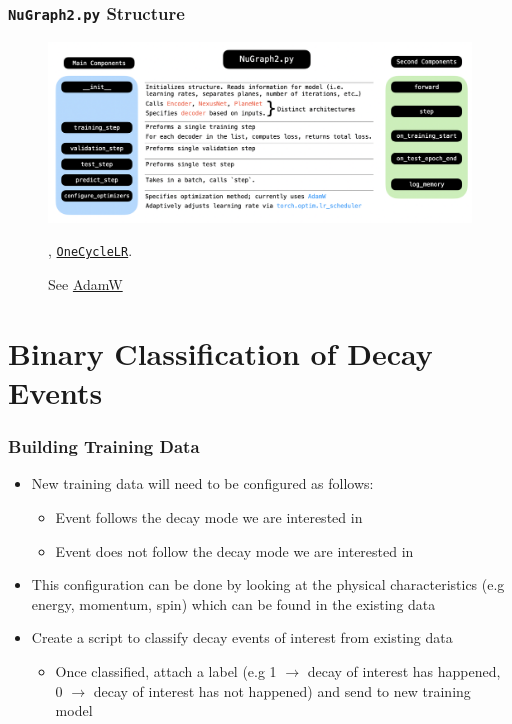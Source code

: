 \documentclass{beamer}
\begin{document}
\begin{frame}
	\frametitle{\texttt{NuGraph2.py} Structure}
		\begin{figure}[h!]
			\includegraphics[width=1\textwidth]{images/model2.png}
			\caption{See \href{https://pytorch.org/docs/stable/generated/torch.optim.AdamW.html}{\color{blue} AdamW}}, \href{https://pytorch.org/docs/stable/generated/torch.optim.lr_scheduler.OneCycleLR.html}{\color{blue} \texttt{OneCycleLR}}.
			\label{model2}
		\end{figure}
\end{frame}


\section{Binary Classification of Decay Events}


\begin{frame}
\frametitle{Building Training Data}
	\begin{itemize}
		\item New training data will need to be configured as follows:
			\begin{itemize}
				\item Event follows the decay mode we are interested in
				\item Event does not follow the decay mode we are interested in
			\end{itemize}
		\item This configuration can be done by looking at the physical characteristics (e.g energy, momentum, spin) which can be found in the existing data
		\item Create a script to classify decay events of interest from existing data
			\begin{itemize}
				\item Once classified, attach a label (e.g 1 $\rightarrow$ decay of interest has happened, 0 $\rightarrow$ decay of interest has not happened) and send to new training model
			\end{itemize}
	\end{itemize}
\end{frame}
\end{document}
